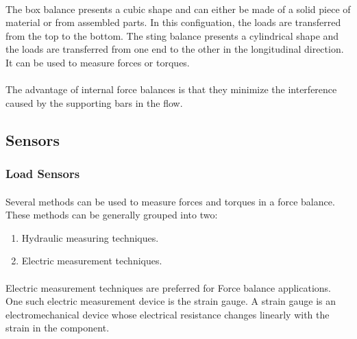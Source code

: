 \paragraph{}The box balance presents a cubic shape and can either be made of a solid piece of material or from assembled parts. In this configuation, the loads are transferred from the top to the bottom. The sting balance presents a cylindrical shape and the loads are transferred from one end to the other in the longitudinal direction. It can be used to measure forces or torques.
\paragraph{}The advantage of internal force balances is that they minimize the interference caused by the supporting bars in the flow.
\subsection{Sensors}
\subsubsection{Load Sensors}
\paragraph{}Several methods can be used to measure forces and torques in a force balance. These methods can be generally grouped into two:
\begin{enumerate}
\item Hydraulic measuring techniques.
\item Electric measurement techniques.
\end{enumerate}
\paragraph{}Electric measurement techniques are preferred for Force balance applications. One such electric measurement device is the strain gauge. A strain gauge is an electromechanical device whose electrical resistance changes linearly with the strain in the component.
